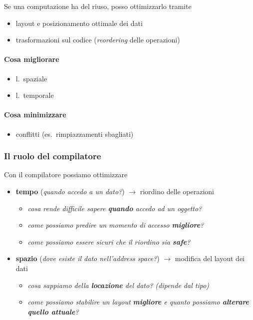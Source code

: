 Se una computazione ha del riuso, posso ottimizzarlo tramite
\begin{itemize}
  \item layout e posizionamento ottimale dei dati
  \item trasformazioni sul codice (\textit{reordering} delle operazioni)
\end{itemize}

\noindent
\begin{minipage}[t]{.45\textwidth}
\paragraph{Cosa migliorare}
\begin{itemize}
  \item l.~spaziale
  \item l.~temporale
\end{itemize}
\end{minipage}\hfill\vline\hfill
\begin{minipage}[t]{.45\textwidth}
\paragraph{Cosa minimizzare}
\begin{itemize}
  \item conflitti (es.~rimpiazzamenti sbagliati)
\end{itemize}
\end{minipage}

\subsubsection{Il ruolo del compilatore}

Con il compilatore possiamo ottimizzare
\begin{itemize}
  \item \textbf{tempo} (\textit{quando accedo a un dato?}) $\rightarrow$ riordino delle operazioni
  \begin{itemize}
    \item \textit{cosa rende difficile sapere \textbf{quando} accedo ad un oggetto?}
    \item \textit{come possiamo predire un momento di accesso \textbf{migliore}?}
    \item \textit{come possiamo essere sicuri che il riordino sia \textbf{safe}?}
  \end{itemize}
  
  \item \textbf{spazio} (\textit{dove esiste il dato nell'address space?}) $\rightarrow$ modifica del layout dei dati
  \begin{itemize}
    \item \textit{cosa sappiamo della \textbf{locazione} del dato? (dipende dal tipo)}
    \item \textit{come possiamo stabilire un layout \textbf{migliore} e quanto possiamo \textbf{alterare quello attuale}?}
  \end{itemize}
  
\end{itemize}


